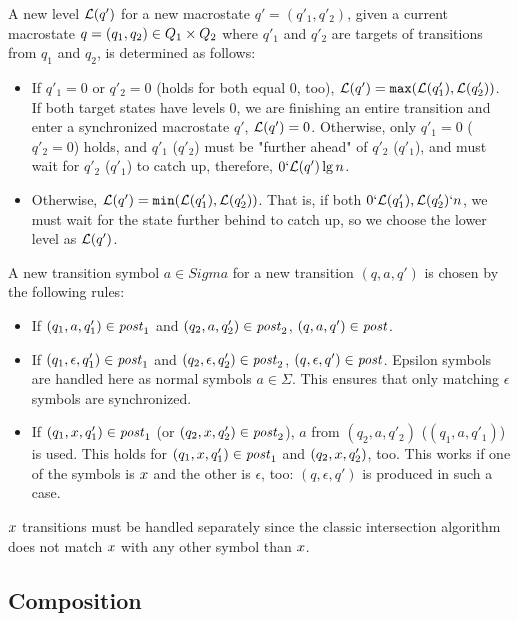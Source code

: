 A new level $\mathcal{L}(q')$ for a new macrostate $q' = (q'_1, q'_2)$, given a current macrostate $q = (q_1, q_2) \in Q_1 \times Q_2$ where $q'_1$ and $q'_2$ are targets of transitions from $q_1$ and $q_2$, is determined as follows:
\begin{itemize}
  \item If $q'_1 = 0$ or $q'_2 = 0$ (holds for both equal $0$, too), $\mathcal{L}(q') = \texttt{max}(\mathcal{L}(q'_1), \mathcal{L}(q'_2))$. If both target states have levels $0$, we are finishing an entire \nft transition and enter a synchronized macrostate $q'$, $\mathcal{L}(q') = 0$. Otherwise, only $q'_1 = 0$ ($q'_2 = 0$) holds, and $q'_1$ ($q'_2$) must be "further ahead" of $q'_2$ ($q'_1$), and must wait for $q'_2$ ($q'_1$) to catch up, therefore, $0 \lq \level{q'} \lg n$.
  \item Otherwise, $\mathcal{L}(q') = \texttt{min}(\mathcal{L}(q'_1), \mathcal{L}(q'_2))$. That is, if both $0 \lq \level{q'_1}, \level{q'_2} \lq n$, we must wait for the state further behind to catch up, so we choose the lower level as $\mathcal{L}(q')$.
\end{itemize}

A new transition symbol $a \in Sigma$ for a new transition $(q, a, q')$ is chosen by the following rules:
\begin{itemize}
  \item If $(q_1, a, q'_1) \in \mathit{post}_1$ and $(q_2, a, q'_2) \in \mathit{post}_2$, $(q, a, q') \in \mathit{post}$.
  \item If $(q_1, \epsilon, q'_1) \in \mathit{post}_1$ and $(q_2, \epsilon, q'_2) \in \mathit{post}_2$, $(q, \epsilon, q') \in \mathit{post}$. Epsilon symbols are handled here as normal symbols $a \in \Sigma$. This ensures that only matching $\epsilon$ symbols are synchronized.
  \item If $(q_1, x, q'_1) \in \mathit{post}_1$ (or $(q_2, x, q'_2) \in \mathit{post}_2$), $a$ from $(q_2, a, q'_2)$ ($(q_1, a, q'_1)$) is used.
  This holds for $(q_1, x, q'_1) \in \mathit{post}_1$ and $(q_2, x, q'_2)$, too.
  This works if one of the symbols is $x$ and the other is $\epsilon$, too: $(q, \epsilon, q')$ is produced in such a case.
\end{itemize}

$x$ transitions must be handled separately since the classic intersection algorithm does not match $x$ with any other symbol than $x$.

\subsection{Composition}


